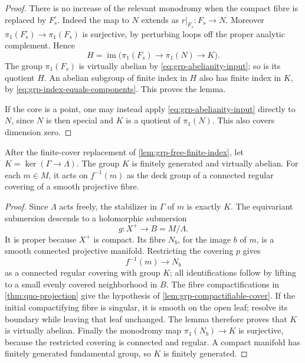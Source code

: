 \begin{proof}
There is no increase of the relevant monodromy when the compact fibre is replaced by $F_s^\circ$.  Indeed the map to $N$ extends as $r|_{F_s}:F_s\to N$.  Moreover $\pi_1(F_s^\circ)\to\pi_1(F_s)$ is surjective, by perturbing loops off the proper analytic complement.  Hence
\[
 H=\operatorname{im}\bigl(\pi_1(F_s)\longrightarrow\pi_1(N)
                  \longrightarrow K\bigr).
\]
The group $\pi_1(F_s)$ is virtually abelian by \eqref{eq:grp-abelianity-input}; so is its quotient $H$. An abelian subgroup of finite index in $H$ also has finite index in $K$, by \eqref{eq:grp-index-equals-components}.  This proves the lemma.

If the core is a point, one may instead apply \eqref{eq:grp-abelianity-input} directly to $N$, since $N$ is then special and $K$ is a quotient of $\pi_1(N)$.  This also covers dimension zero.
\end{proof}

\begin{theorem}\label{thm:grp-kernel-abelian}
After the finite-cover replacement of \cref{lem:grp-free-finite-index}, let $K=\ker(\Gamma\to\Lambda)$.  The group $K$ is finitely generated and virtually abelian.  For each $m\in M$, it acts on $f^{-1}(m)$ as the deck group of a connected regular covering of a smooth projective fibre.
\end{theorem}

\begin{proof}
Since $\Lambda$ acts freely, the stabilizer in $\Gamma$ of $m$ is exactly $K$.  The equivariant submersion descends to a holomorphic submersion
\[
 g:X^+\longrightarrow B=M/\Lambda.
\]
It is proper because $X^+$ is compact.  Its fibre $N_b$, for the image $b$ of $m$, is a smooth connected projective manifold.  Restricting the covering $p$ gives
\[
 f^{-1}(m)\longrightarrow N_b
\]
as a connected regular covering with group $K$; all identifications follow by lifting to a small evenly covered neighborhood in $B$. The fibre compactifications in \cref{thm:quo-projection} give the hypothesis of \cref{lem:grp-compactifiable-cover}.  If the initial compactifying fibre is singular, it is smooth on the open leaf; resolve its boundary while leaving that leaf unchanged.  The lemma therefore proves that $K$ is virtually abelian. Finally the monodromy map $\pi_1(N_b)\to K$ is surjective, because the restricted covering is connected and regular.  A compact manifold has finitely generated fundamental group, so $K$ is finitely generated.
\end{proof}
